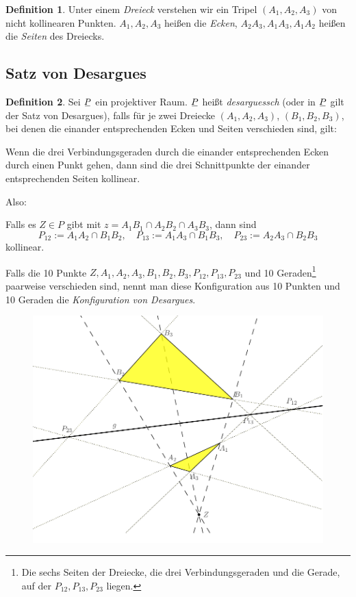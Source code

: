 \documentclass[
 a4paper,
 12pt,
 parskip=half
 ]{scrartcl}
\theoremstyle{plain}
\theoremstyle{definition}
\newtheorem*{defn*}{Definition}
\begin{document}
\begin{defn*}
 Unter einem \emph{Dreieck} verstehen wir ein Tripel $(A_1, A_2, A_3)$ von nicht kollinearen Punkten. $A_1, A_2, A_3$ heißen die \emph{Ecken}, $A_2 A_3, A_1 A_3, A_1 A_2$ heißen die \emph{Seiten} des Dreiecks.
\end{defn*}

\subsection{Satz von Desargues}
\begin{defn*}
 Sei $\proj$ ein projektiver Raum. $\proj$ heißt \emph{desarguessch} (oder in $\proj$ gilt der Satz von Desargues), falls für je zwei Dreiecke $(A_1, A_2, A_3)$, $(B_1, B_2, B_3)$, bei denen die einander entsprechenden Ecken und Seiten verschieden sind, gilt: 
 \begin{addmargin}[.5cm]{0cm}
 Wenn die drei Verbindungsgeraden durch die einander entsprechenden Ecken durch einen Punkt gehen, dann sind die drei Schnittpunkte der einander entsprechenden Seiten kollinear. 
 \end{addmargin}
 Also:
 \begin{addmargin}[.5cm]{0cm}
 Falls es $Z \in P$ gibt mit $z = A_1 B_1 \cap A_2 B_2 \cap A_3 B_3$, dann sind
 \[ P_{12} := A_1 A_2 \cap B_1 B_2, \quad P_{13} := A_1 A_3 \cap B_1 B_3, \quad P_{23} := A_2 A_3 \cap B_2 B_3 \]
 kollinear.
 \end{addmargin}

 Falls die 10 Punkte $Z, A_1, A_2, A_3, B_1, B_2, B_3, P_{12}, P_{13}, P_{23}$ und 10 Geraden\footnote{Die sechs Seiten der Dreiecke, die drei Verbindungsgeraden und die Gerade, auf der $P_{12}, P_{13}, P_{23}$ liegen.}  paarweise verschieden sind, nennt man diese Konfiguration aus 10 Punkten und 10 Geraden die \emph{Konfiguration von Desargues}.
\end{defn*}

\begin{figure}[ht]
 \center
 \includegraphics[width=12cm]{img/desargues}
\end{figure}
\end{document}
